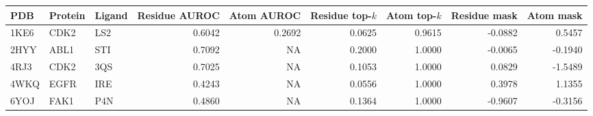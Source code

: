 \begin{tabular}{lllrrrrrr}
\toprule
PDB & Protein & Ligand & Residue AUROC & Atom AUROC & Residue top-$k$ & Atom top-$k$ & Residue mask & Atom mask \\
\midrule
1KE6 & CDK2 & LS2 & 0.6042 & 0.2692 & 0.0625 & 0.9615 & -0.0882 & 0.5457 \\
2HYY & ABL1 & STI & 0.7092 & NA & 0.2000 & 1.0000 & -0.0065 & -0.1940 \\
4RJ3 & CDK2   & 3QS & 0.7025 & NA & 0.1053 & 1.0000 & 0.0829 & -1.5489 \\
4WKQ & EGFR & IRE & 0.4243 & NA & 0.0556 & 1.0000 & 0.3978 & 1.1355 \\
6YOJ & FAK1 & P4N & 0.4860 & NA & 0.1364 & 1.0000 & -0.9607 & -0.3156 \\
\bottomrule
\end{tabular}
